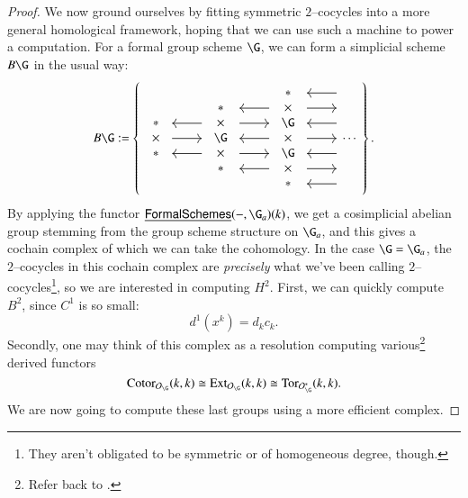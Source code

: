 \begin{proof}
We now ground ourselves by fitting symmetric $2$--cocycles into a more general homological framework, hoping that we can use such a machine to power a computation.  For a formal group scheme $\G$, we can form a simplicial scheme $B\G$ in the usual way:
\[B\G := \left\{
\begin{tikzcd}[ampersand replacement=\&]
\begin{array}{c} * \\ \times \\ * \end{array} \arrow{r} \arrow[leftarrow,shift left=\baselineskip]{r} \arrow[leftarrow,shift right=\baselineskip]{r} \&
\begin{array}{c} * \\ \times \\ \G \\ \times \\ * \end{array} \arrow[leftarrow, shift left=(2*\baselineskip)]{r} \arrow[shift left=\baselineskip]{r} \arrow[leftarrow]{r} \arrow[shift right=\baselineskip]{r} \arrow[leftarrow, shift right=(2*\baselineskip)]{r} \&
\begin{array}{c} * \\ \times \\ \G \\ \times \\ \G \\ \times \\ *\end{array} \arrow[leftarrow, shift left=(3*\baselineskip)]{r} \arrow[shift left=(2*\baselineskip)]{r} \arrow[leftarrow, shift left=\baselineskip]{r} \arrow{r} \arrow[leftarrow, shift right=\baselineskip]{r} \arrow[shift right=(2*\baselineskip)]{r} \arrow[leftarrow, shift right=(3*\baselineskip)]{r} \&
\cdots
\end{tikzcd}
\right\}.\]
By applying the functor $\InternalHom{FormalSchemes}(-, \G_a)(k)$, we get a cosimplicial abelian group stemming from the group scheme structure on $\G_a$, and this gives a cochain complex of which we can take the cohomology.  In the case $\G = \G_a$, the $2$--cocycles in this cochain complex are \emph{precisely} what we've been calling $2$--cocycles\footnote{They aren't obligated to be symmetric or of homogeneous degree, though.}, so we are interested in computing $H^2$.  First, we can quickly compute $B^2$, since $C^1$ is so small: \[d^1(x^k) = d_k c_k.\]  Secondly, one may think of this complex as a resolution computing various\footnote{Refer back to .} derived functors \[\Cotor_{\sheaf O_{\G}}(k, k) \cong \Ext_{\sheaf O_{\G}}(k, k) \cong \Tor_{\sheaf O_{\G}^*}(k, k).\]  We are now going to compute these last groups using a more efficient complex.


\end{proof}
